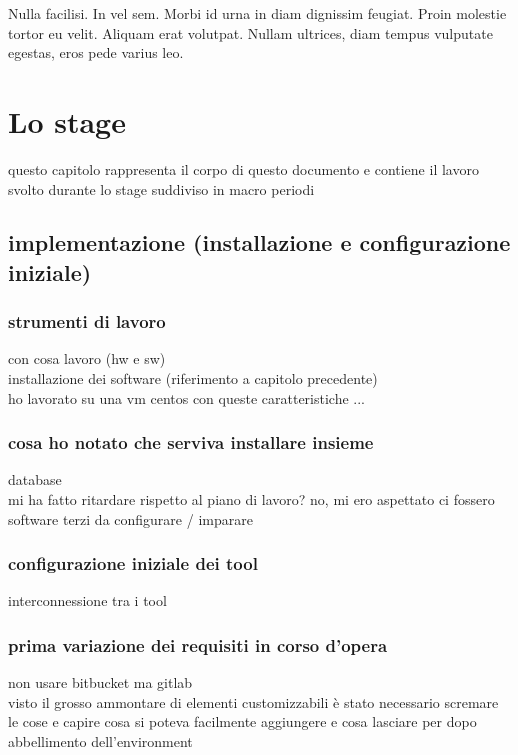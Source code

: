 \begin{savequote}[75mm]
Nulla facilisi. In vel sem. Morbi id urna in diam dignissim feugiat. Proin molestie tortor eu velit. Aliquam erat volutpat. Nullam ultrices, diam tempus vulputate egestas, eros pede varius leo.
\end{savequote}

\chapter{Lo stage}

questo capitolo rappresenta il corpo di questo documento e contiene il lavoro svolto durante lo stage suddiviso in macro periodi

\section{implementazione (installazione e configurazione iniziale)}

	\subsection{strumenti di lavoro}
		con cosa lavoro (hw e sw)\\
		installazione dei software (riferimento a capitolo precedente)\\
		ho lavorato su una vm centos con queste caratteristiche ...
		
	\subsection{cosa ho notato che serviva installare insieme}
		database\\
		mi ha fatto ritardare rispetto al piano di lavoro? no, mi ero aspettato ci fossero software terzi da configurare / imparare
	
	\subsection{configurazione iniziale dei tool}
		interconnessione tra i tool
	
	\subsection{prima variazione dei requisiti in corso d'opera}
		non usare bitbucket ma gitlab\\
		visto il grosso ammontare di elementi customizzabili è stato necessario scremare le cose e capire cosa si poteva facilmente aggiungere e cosa lasciare per dopo\\
		abbellimento dell'environment
	
